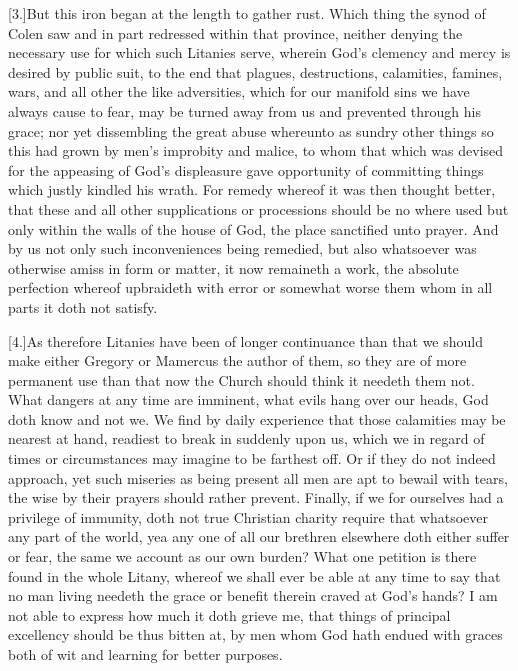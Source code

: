 [3.]But this iron began at the length to gather rust. Which thing the synod of Colen saw and in part redressed within that province, neither denying the necessary use for which such Litanies serve, wherein God’s clemency and mercy is desired by public suit, to the end that plagues, destructions, calamities, famines, wars, and all other the like adversities, which for our manifold sins we have always cause to fear, may  be turned away from us and prevented through his grace;
 nor yet dissembling the great abuse whereunto as sundry other things so this had grown by men’s improbity and malice, to whom that which was devised for the appeasing of God’s displeasure gave opportunity of committing things which justly kindled his wrath. For remedy whereof it was then thought better, that these and all other supplications or processions should be no where used but only within the walls of the house of God, the place sanctified unto prayer. And by us not only such inconveniences being remedied, but also whatsoever was otherwise amiss in form or matter, it now remaineth a work, the absolute perfection whereof upbraideth with error or somewhat worse them whom in all parts it doth not satisfy.

[4.]As therefore Litanies have been of longer continuance than that we should make either Gregory or Mamercus the author of them, so they are of more permanent use than that now the Church should think it needeth them not. What dangers at any time are imminent, what evils hang over our heads, God doth know and not we. We find by daily experience that those calamities may be nearest at hand, readiest to break in suddenly upon us, which we in regard of times or circumstances may imagine to be farthest off. Or if they do not indeed approach, yet such miseries as being present all men are apt to bewail with tears, the wise by their prayers should rather prevent. Finally, if we for ourselves had a privilege of immunity, doth not true Christian charity require that whatsoever any part of the world, yea any one of all our brethren elsewhere doth either suffer or fear, the same we account as our own burden? What one petition is there found in the whole Litany, whereof we shall ever be able at any time to say that no man living needeth the grace or benefit therein craved at God’s hands? I am not able to express how much it doth grieve me, that things of principal excellency should be thus bitten at, by men whom God hath endued with graces both of wit and learning for better purposes.


